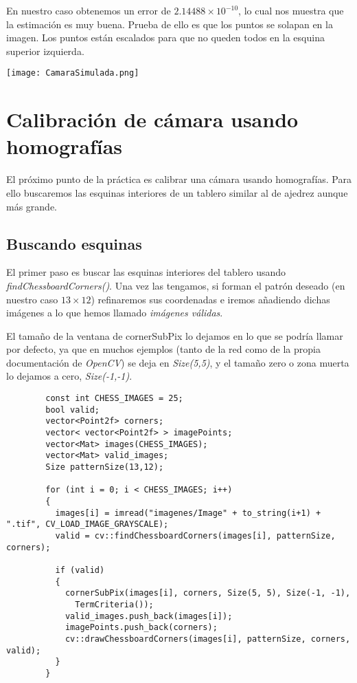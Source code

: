 \documentclass[a4paper, 11pt]{article}
\theoremstyle{definition}
\begin{document}
      En nuestro caso obtenemos un error de $2.14488 \times 10^{-10}$, lo cual nos muestra
      que la estimación es muy buena. Prueba de ello es que los puntos se solapan en la imagen.
      Los puntos están escalados para que no queden todos en la esquina superior izquierda. \\

      \centerline{\texttt{[image: CamaraSimulada.png]}}

    \section{Calibración de cámara usando homografías}

      El próximo punto de la práctica es calibrar una cámara usando homografías.
      Para ello buscaremos las esquinas interiores de un tablero similar al de ajedrez aunque más grande.

      \subsection{Buscando esquinas}
        El primer paso es buscar las esquinas interiores del tablero usando \emph{findChessboardCorners()}.
        Una vez las tengamos, si forman el patrón deseado (en nuestro caso $13\times12$) refinaremos sus coordenadas
        e iremos añadiendo dichas imágenes a lo que hemos llamado \emph{imágenes válidas}.

        El tamaño de la ventana de cornerSubPix lo dejamos en lo que se podría llamar por defecto,
        ya que en muchos ejemplos (tanto de la red como de la propia documentación de \emph{OpenCV})
        se deja en \emph{Size(5,5)}, y el tamaño zero o zona muerta lo dejamos a cero, \emph{Size(-1,-1)}.

      \begin{lstlisting}
        const int CHESS_IMAGES = 25;
        bool valid;
        vector<Point2f> corners;
        vector< vector<Point2f> > imagePoints;
        vector<Mat> images(CHESS_IMAGES);
        vector<Mat> valid_images;
        Size patternSize(13,12);

        for (int i = 0; i < CHESS_IMAGES; i++)
        {
          images[i] = imread("imagenes/Image" + to_string(i+1) + ".tif", CV_LOAD_IMAGE_GRAYSCALE);
          valid = cv::findChessboardCorners(images[i], patternSize, corners);

          if (valid)
          {
            cornerSubPix(images[i], corners, Size(5, 5), Size(-1, -1),
              TermCriteria());
            valid_images.push_back(images[i]);
            imagePoints.push_back(corners);
            cv::drawChessboardCorners(images[i], patternSize, corners, valid);
          }
        }
      \end{lstlisting}
\end{document}
